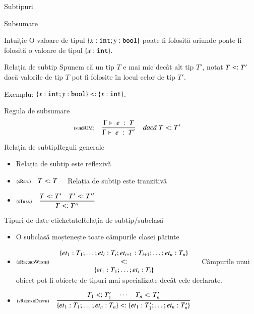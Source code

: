 \documentclass[xcolor=pdftex,romanian,colorlinks]{beamer}
\begin{document}
\begin{section}{Subtipuri}
\begin{frame}{Subsumare}
\begin{block}{Intuiție}
O valoare de tipul $\{x:{\mathrel{\text{\ttfamily int}}};y:{\mathrel{\text{\ttfamily bool}}}\}$ poate fi folosită oriunde poate fi folosită o valoare de tipul $\{x:{\mathrel{\text{\ttfamily int}}}\}$.
\end{block}

\begin{block}{Relația de subtip}
Spunem că un tip $T$ e mai mic decât alt tip $T'$, notat $T \mathrel{<:} T'$ dacă valorile de tip $T$ pot fi folosite în locul celor de tip $T'$.  

Exemplu:
$\{x:{\mathrel{\text{\ttfamily int}}};y:{\mathrel{\text{\ttfamily bool}}}\} \mathrel{<:} \{x:{\mathrel{\text{\ttfamily int}}}\}$.
\end{block}

\begin{block}{Regula de subsumare}
\[\reg[subSUM]{\tjud{e}{T'}{}}{\tjud{e}{T}{}}{T\stip T'}\]
\end{block}
\end{frame}

\begin{frame}{Relația de subtip}{Reguli generale}
\begin{itemize}
\item Relația de subtip este reflexivă
\item[] $\displaystyle\reg[sRefl]{T\stip T}{}{}$
\vitem Relația de subtip este tranzitivă
\item[] $\displaystyle\reg[sTran]{T\stip T''}{T\stip T' \si T' \stip T''}{}$
\end{itemize}
\end{frame}

\begin{frame}{Tipuri de date etichetate}{Relația de subtip/subclasă}
\begin{itemize}
\item O subclasă moștenește toate câmpurile clasei părinte
\item[] $\reg[sRecordWidth]{\begin{array}{c}\{{\it et}_1 : T_1;\ldots;{\it et}_{i}:T_{i};{\it et}_{i+1} : T_{i+1};\ldots;{\it et}_{n}:T_{n}\}\\\stip\\\{{\it et}_1 : T_1;\ldots;{\it et}_{i}:T_{i}\}\end{array}}{}{}$
\vitem Câmpurile unui obiect pot fi obiecte de tipuri mai specializate decât cele declarate. 
\item[] $\displaystyle\reg[sRecordDepth]{\{{\it et}_1 : T_1;\ldots;{\it et}_{n}:T_{n}\} \stip \{{\it et}_1 : T_1';\ldots;{\it et}_{n}:T_{n}'\}}{T_1\stip T_1'\si\cdots\si T_n\stip T_n'}{}$
\end{itemize}
\end{frame} 


\end{section}
\end{document}
